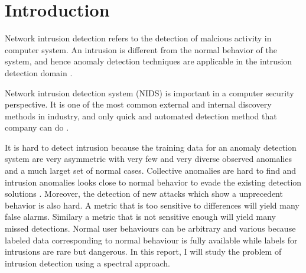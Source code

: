 \section{Introduction}
Network intrusion detection refers to the detection of malcious activity in computer system. 
An intrusion is different from the normal behavior of the system, and hence anomaly detection techniques are applicable in the intrusion detection domain \cite{chandola09}.

Network intrusion detection system (NIDS) is important in a computer security perspective. 
It is one of the most common external and internal discovery methods in industry, and only quick and automated detection method that company can do \cite{verizon14}. 

It is hard to detect intrusion because the training data for an anomaly detection system are very asymmetric with very few and very diverse observed anomalies and a much larget set of normal cases. 
Collective anomalies are hard to find and intrusion anomalies looks close to normal behavior to evade the existing detection solutions \cite{chandola09}. 
Moreover, the detection of new attacks which show a unprecedent behavior is also hard. 
A metric that is too sensitive to differences will yield many false alarms. 
Similary a metric that is not sensitive enough will yield many missed detections.
Normal user behaviours can be arbitrary and various because labeled data corresponding to normal behaviour is fully available while labels for intrusions are rare but dangerous. 
In this report, I will study the problem of intrusion detection using a spectral approach. 
